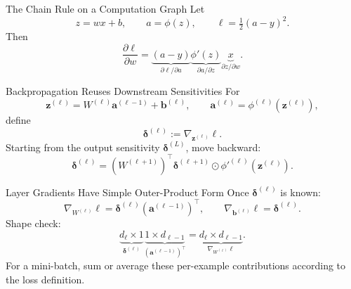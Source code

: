\documentclass[10pt,aspectratio=169]{ntuabeamer}
\begin{document}
\begin{frame}{The Chain Rule on a Computation Graph}
  Let
  \[
    z=wx+b,\qquad a=\phi(z),\qquad \ell=\tfrac12(a-y)^2.
  \]
  Then
  \[
    \frac{\partial\ell}{\partial w}
    =\underbrace{(a-y)}_{\partial\ell/\partial a}
     \underbrace{\phi'(z)}_{\partial a/\partial z}
     \underbrace{x}_{\partial z/\partial w}.
  \]
  \begin{center}
  \end{center}
\end{frame}

\begin{frame}{Backpropagation Reuses Downstream Sensitivities}
  For
  \[
    \mathbf z^{(\ell)}=W^{(\ell)}\mathbf a^{(\ell-1)}+\mathbf b^{(\ell)},
    \qquad
    \mathbf a^{(\ell)}=\phi^{(\ell)}(\mathbf z^{(\ell)}),
  \]
  define
  \[
    \boldsymbol\delta^{(\ell)}
    :=\nabla_{\mathbf z^{(\ell)}}\ell.
  \]
  Starting from the output sensitivity $\boldsymbol\delta^{(L)}$, move backward:
  \[
    \boldsymbol\delta^{(\ell)}=
    \left(W^{(\ell+1)}\right)^\top\boldsymbol\delta^{(\ell+1)}
    \odot \phi'^{(\ell)}(\mathbf z^{(\ell)}).
  \]
\end{frame}

\begin{frame}{Layer Gradients Have Simple Outer-Product Form}
  Once $\boldsymbol\delta^{(\ell)}$ is known:
  \[
    \nabla_{W^{(\ell)}}\ell
    =\boldsymbol\delta^{(\ell)}
      \left(\mathbf a^{(\ell-1)}\right)^\top,
    \qquad
    \nabla_{\mathbf b^{(\ell)}}\ell
    =\boldsymbol\delta^{(\ell)}.
  \]
  Shape check:
  \[
    \underbrace{d_\ell\times1}_{\boldsymbol\delta^{(\ell)}}
    \underbrace{1\times d_{\ell-1}}_{(\mathbf a^{(\ell-1)})^\top}
    =
    \underbrace{d_\ell\times d_{\ell-1}}_{\nabla_{W^{(\ell)}}\ell}.
  \]
  For a mini-batch, sum or average these per-example contributions according to the loss definition.
\end{frame}
\end{document}
